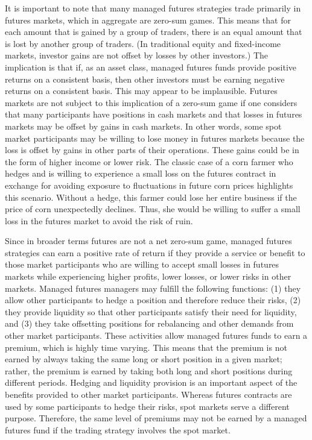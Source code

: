 \documentclass[11pt]{article}
\begin{document}
It is important to note that many managed futures strategies trade primarily in futures markets, which in aggregate are zero-sum games. This means that for each amount that is gained by a group of traders, there is an equal amount that is lost by another group of traders. (In traditional equity and fixed-income markets, investor gains are not offset by losses by other investors.) The implication is that if, as an asset class, managed futures funds provide positive returns on a consistent basis, then other investors must be earning negative returns on a consistent basis. This may appear to be implausible. Futures markets are not subject to this implication of a zero-sum game if one considers that many participants have positions in cash markets and that losses in futures markets may be offset by gains in cash markets. In other words, some spot market participants may be willing to lose money in futures markets because the loss is offset by gains in other parts of their operations. These gains could be in the form of higher income or lower risk. The classic case of a corn farmer who hedges and is willing to experience a small loss on the futures contract in exchange for avoiding exposure to fluctuations in future corn prices highlights this scenario. Without a hedge, this farmer could lose her entire business if the price of corn unexpectedly declines. Thus, she would be willing to suffer a small loss in the futures market to avoid the risk of ruin.

Since in broader terms futures are not a net zero-sum game, managed futures strategies can earn a positive rate of return if they provide a service or benefit to those market participants who are willing to accept small losses in futures markets while experiencing higher profits, lower losses, or lower risks in other markets. Managed futures managers may fulfill the following functions: (1) they allow other participants to hedge a position and therefore reduce their risks, (2) they provide liquidity so that other participants satisfy their need for liquidity, and (3) they take offsetting positions for rebalancing and other demands from other market participants. These activities allow managed futures funds to earn a premium, which is highly time varying. This means that the premium is not earned by always taking the same long or short position in a given market; rather, the premium is earned by taking both long and short positions during different periods. Hedging and liquidity provision is an important aspect of the benefits provided to other market participants. Whereas futures contracts are used by some participants to hedge their risks, spot markets serve a different purpose. Therefore, the same level of premiums may not be earned by a managed futures fund if the trading strategy involves the spot market.
\end{document}

